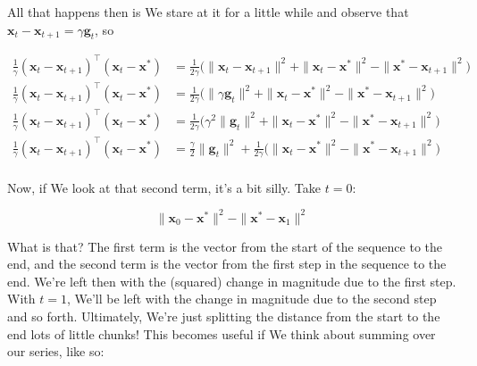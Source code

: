 \documentclass{article}
\begin{document}
	All that happens then is We stare at it for a little while and observe that $\mathbf{x}_t - \mathbf{x}_{t+1} = \gamma\mathbf{g}_t$, so
	
	\begin{align*}
		\frac{1}{\gamma}(\mathbf{x}_t - \mathbf{x}_{t+1})^\top (\mathbf{x}_t - \mathbf{x}^*) &= \frac{1}{2\gamma}\big( \|\mathbf{x}_t - \mathbf{x}_{t+1}\|^2 + \|\mathbf{x}_t - \mathbf{x}^*\|^2 - \| \mathbf{x}^* - \mathbf{x}_{t+1} \|^2 \big) \\
		\frac{1}{\gamma}(\mathbf{x}_t - \mathbf{x}_{t+1})^\top (\mathbf{x}_t - \mathbf{x}^*) &= \frac{1}{2\gamma}\big( \| \gamma\mathbf{g}_t\|^2 + \|\mathbf{x}_t - \mathbf{x}^*\|^2 - \| \mathbf{x}^* - \mathbf{x}_{t+1} \|^2 \big) \\
		\frac{1}{\gamma}(\mathbf{x}_t - \mathbf{x}_{t+1})^\top (\mathbf{x}_t - \mathbf{x}^*) &= \frac{1}{2\gamma}\big( \gamma^2\|\mathbf{g}_t\|^2 + \|\mathbf{x}_t - \mathbf{x}^*\|^2 - \| \mathbf{x}^* - \mathbf{x}_{t+1} \|^2 \big) \\
		\frac{1}{\gamma}(\mathbf{x}_t - \mathbf{x}_{t+1})^\top (\mathbf{x}_t - \mathbf{x}^*) &=  \frac{\gamma}{2} \|\mathbf{g}_t\|^2 + \frac{1}{2\gamma}\big( \|\mathbf{x}_t - \mathbf{x}^*\|^2 - \| \mathbf{x}^* - \mathbf{x}_{t+1} \|^2 \big) \\
	\end{align*}
	
	Now, if We look at that second term, it's a bit silly. Take $t=0$: 
	
	\[  \|\mathbf{x}_0 - \mathbf{x}^*\|^2 - \| \mathbf{x}^* - \mathbf{x}_{1} \|^2 \]
	
	What is that? The first term is the vector from the start of the sequence to the end, and the second term is the vector from the first step in the sequence to the end. We're left then with the (squared) change in magnitude due to the first step. With $t=1$, We'll be left with the change in magnitude due to the second step and so forth. Ultimately, We're just splitting the distance from the start to the end lots of little chunks! This becomes useful if We think about summing over our series, like so:
	
\end{document}
